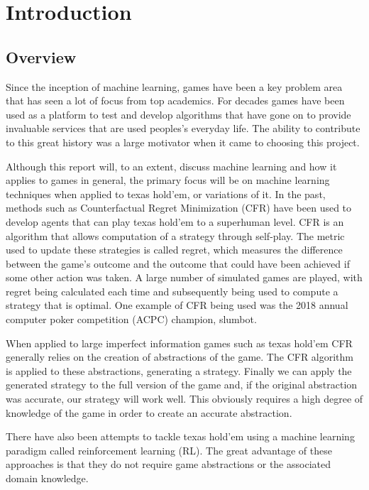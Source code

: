 \chapter{Introduction}
\label{ch:intro}

\section{Overview}\label{sec:overview}
Since the inception of machine learning, games have been a key problem area that has seen a lot of focus from
top academics.
For decades games have been used as a platform to test and develop algorithms that have gone on to provide invaluable
services that are used peoples's everyday life.
The ability to contribute to this great history was a large motivator when it came to choosing this project.

Although this report will, to an extent, discuss machine learning and how it applies to games in general, the
primary focus will be on machine learning techniques when applied to texas hold'em, or variations of it.
In the past, methods such as Counterfactual Regret Minimization (CFR) have been used to develop agents that can
play texas hold'em to a superhuman level.
CFR is an algorithm that allows computation of a strategy through self-play.
The metric used to update these strategies is called regret, which measures the difference between the
game's outcome and the outcome that could have been achieved if some other action was taken.
A large number of simulated games are played, with regret being calculated each time and subsequently being used
to compute a strategy that is optimal.
One example of CFR being used was the 2018 annual computer poker competition (ACPC) champion, slumbot\citep{jackson2013slumbot}.

When applied to large imperfect information games such as texas hold'em CFR generally relies on the
creation of abstractions of the game.
The CFR algorithm is applied to these abstractions, generating a strategy.
Finally we can apply the generated strategy to the full version of the game and, if the
original abstraction was accurate, our strategy will work well.
This obviously requires a high degree of knowledge of the game in order to create an accurate abstraction.

There have also been attempts to tackle texas hold'em using a machine learning paradigm called reinforcement
learning (RL).
The great advantage of these approaches is that they do not require game abstractions or the associated
domain knowledge.

